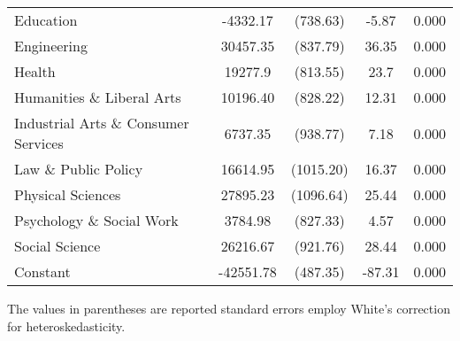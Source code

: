 \documentclass[11pt]{article}
\theoremstyle{definition}
\begin{document}
{\begin{center}
\begin{tabular}{l c c c c}
Education & -4332.17 & (738.63) & -5.87 & 0.000  \\
Engineering & 30457.35 & (837.79) & 36.35 & 0.000 \\
Health & 19277.9 & (813.55) & 23.7 & 0.000 \\
Humanities \& Liberal Arts & 10196.40 & (828.22) & 12.31 & 0.000 \\
Industrial Arts \& Consumer Services & 6737.35 & (938.77) & 7.18 & 0.000 \\
Law \& Public Policy & 16614.95 & (1015.20) & 16.37 & 0.000 \\
Physical Sciences & 27895.23 & (1096.64) & 25.44 & 0.000 \\
Psychology \& Social Work & 3784.98 & (827.33) & 4.57 & 0.000 \\
Social Science & 26216.67 & (921.76) & 28.44 & 0.000 \\
Constant & -42551.78 & (487.35) & -87.31 & 0.000 \\
\hline\hline
\end{tabular} 
\end{center}} 
\hspace{12mm} \small{The values in parentheses are reported standard errors employ White's correction for heteroskedasticity.} 
\end{document}
